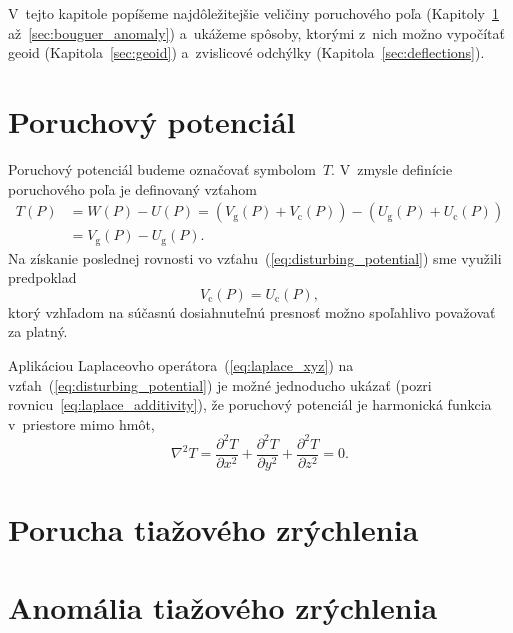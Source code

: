 \documentclass[a4paper,12pt]{book}
\newcommand{\gidx}{\mathrm g}
\newcommand{\cidx}{\mathrm c}
\begin{document}
V~tejto kapitole popíšeme najdôležitejšie veličiny poruchového poľa 
(Kapitoly~\ref{sec:disturbing_potential} až~\ref{sec:bouguer_anomaly}) 
a~ukážeme spôsoby, ktorými z~nich možno vypočítať geoid 
(Kapitola~\ref{sec:geoid}) a~zvislicové odchýlky 
(Kapitola~\ref{sec:deflections}).






\section{Poruchový potenciál}
\label{sec:disturbing_potential}

Poruchový potenciál budeme označovať symbolom~$T$.  V~zmysle definície 
poruchového poľa je definovaný vzťahom
%
\begin{equation}
\label{eq:disturbing_potential}
\begin{split}
T(P) &= W(P) - U(P) = (V_\gidx(P) + V_\cidx(P)) - (U_\gidx(P) + U_\cidx(P))\\
%
&= V_\gidx(P) - U_\gidx(P){.}
\end{split}
\end{equation}
%
Na získanie poslednej rovnosti vo vzťahu~(\ref{eq:disturbing_potential}) sme 
využili predpoklad
%
\begin{equation}
\label{eq:vg_eq_uc}
V_\cidx(P) = U_\cidx(P){,}
\end{equation}
%
ktorý vzhľadom na súčasnú dosiahnuteľnú presnosť možno spoľahlivo považovať za 
platný.

Aplikáciou Laplaceovho operátora~(\ref{eq:laplace_xyz}) na 
vzťah~(\ref{eq:disturbing_potential}) je možné jednoducho ukázať (pozri 
rovnicu~\ref{eq:laplace_additivity}), že poruchový potenciál je harmonická 
funkcia v~priestore mimo hmôt,
%
\begin{equation}
\nabla^2 T = \frac{\partial^2 T}{\partial x^2} + \frac{\partial^2 T}{\partial 
y^2} + \frac{\partial^2 T}{\partial z^2} = 0{.}
\end{equation}
%






\section{Porucha tiažového zrýchlenia}
\label{sec:gravity_disturbance}






\section{Anomália tiažového zrýchlenia}
\label{sec:gravity_anomaly}
\end{document}
